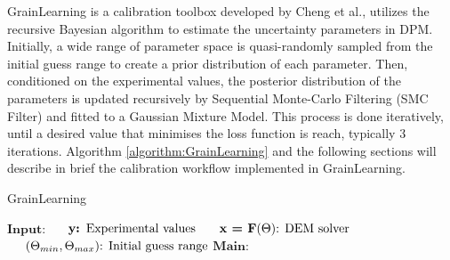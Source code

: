 GrainLearning is a calibration toolbox developed by Cheng et al., utilizes the recursive Bayesian algorithm to estimate the uncertainty parameters in DPM. Initially, a wide range of parameter space is quasi-randomly sampled from the initial guess range to create a prior distribution of each parameter. Then, conditioned on the experimental values, the posterior distribution of the parameters is updated recursively by Sequential Monte-Carlo Filtering (SMC Filter) and fitted to a Gaussian Mixture Model. This process is done iteratively, until a desired value that minimises the loss function is reach, typically 3 iterations. Algorithm \ref{algorithm:GrainLearning} and the following sections will describe in brief the calibration workflow implemented in GrainLearning. 

\begin{algorithm}
    \caption{GrainLearning}\label{algorithm:GrainLearning}
    \begin{algorithmic}
        \State$\textbf{Input:}$
        \State$\hspace*{5mm}\text{\textbf{y: }} \text{Experimental values} $
        \State$\hspace*{5mm} \textbf{x = F$(\Theta)$} \text{: DEM solver}$
        \State$\hspace*{5mm}(\Theta_{min}, \Theta_{max}) \text{: Initial guess range} $
        \State$\textbf{Main:}$


\end{algorithmic}
\end{algorithm}
